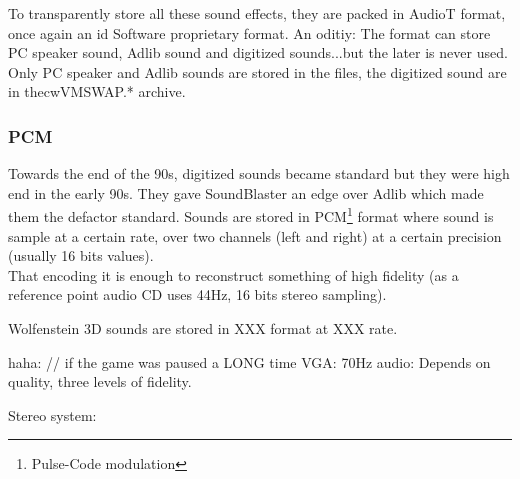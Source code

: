 \par
\begin{minipage}{\textwidth}

\end{minipage}
\par
To transparently store all these sound effects, they are packed in AudioT format, once again an id Software proprietary format. An oditiy: The format can store PC speaker sound, Adlib sound and digitized sounds...but the later is never used. Only PC speaker and Adlib sounds are stored in the  files, the digitized sound are in thecw{VMSWAP.*} archive.\\
\par





\subsubsection{PCM}
Towards the end of the 90s, digitized sounds became standard but they were high end in the early 90s. They gave SoundBlaster an edge over Adlib which made them the defactor standard. Sounds are stored in PCM\footnote{Pulse-Code modulation} format where sound is sample at a certain rate, over two channels (left and right) at a certain precision (usually 16 bits values).\\
That encoding it is enough to reconstruct something of high fidelity (as a reference point audio CD uses 44Hz, 16 bits stereo sampling).\\
\par

Wolfenstein 3D sounds are stored in XXX format at XXX rate.



haha: // if the game was paused a LONG time
VGA: 70Hz
audio: Depends on quality, three levels of fidelity.

\par
Stereo system:\\
\par

